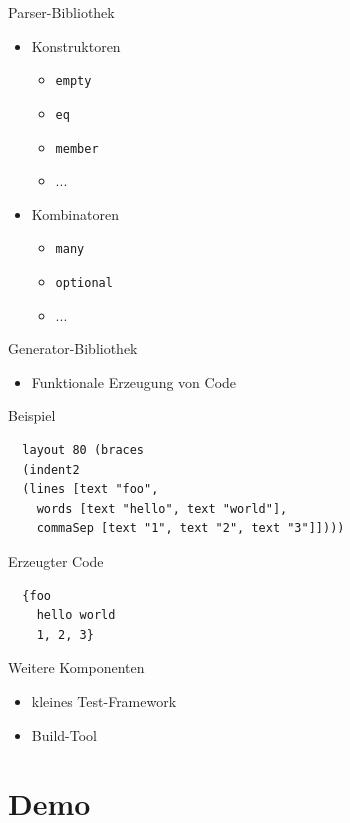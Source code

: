 \documentclass{beamer}
\begin{document}
\begin{frame}[fragile]{Parser-Bibliothek}
  \begin{itemize}
  \item Konstruktoren
    \begin{itemize}
    \item \verb+empty+
    \item \verb+eq+
    \item \verb+member+
    \item ...
    \end{itemize}
  \item Kombinatoren
    \begin{itemize}
    \item \verb+many+
    \item \verb+optional+
    \item ...
    \end{itemize}
  \end{itemize}
\end{frame}

\begin{frame}[fragile]{Generator-Bibliothek}
  \begin{itemize}
  \item Funktionale Erzeugung von Code
  \end{itemize}
  \begin{block}{Beispiel}
\begin{verbatim}
  layout 80 (braces 
  (indent2 
  (lines [text "foo",
    words [text "hello", text "world"],
    commaSep [text "1", text "2", text "3"]])))
\end{verbatim}
  \end{block}
  \begin{block}{Erzeugter Code}
\begin{verbatim}
  {foo
    hello world
    1, 2, 3}
\end{verbatim}
  \end{block}
\end{frame}

\begin{frame}{Weitere Komponenten}
  \begin{itemize}
  \item kleines Test-Framework
  \item Build-Tool
  \end{itemize}
\end{frame}

\section{Demo}
\end{document}
